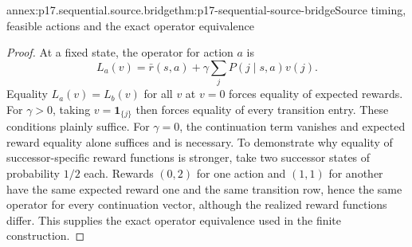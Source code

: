 \begin{annexitem}{annex:p17.sequential.source.bridge}{thm:p17-sequential-source-bridge}{Source timing, feasible actions and the exact operator equivalence}
\begin{proof}
At a fixed state, the operator for
action \(a\) is
\[
                 L_a(v)=\bar r(s,a)
                              +\gamma\sum_jP(j\mid s,a)v(j).
\]
Equality \(L_a(v)=L_b(v)\) for all \(v\)
at \(v=0\) forces equality of expected
rewards. For \(\gamma>0\), taking
\(v=\mathbf1_{\{j\}}\) then forces
equality of every transition entry.
These conditions plainly suffice.
For \(\gamma=0\), the continuation
term vanishes and expected reward
equality alone suffices and is necessary.
To demonstrate why equality of
successor-specific reward functions
is stronger, take two successor states
of probability \(1/2\) each. Rewards
\((0,2)\) for one action and \((1,1)\)
for another have the same expected
reward one and the same transition
row, hence the same operator for
every continuation vector, although
the realized reward functions differ.
This supplies the exact operator
equivalence used in the finite
construction.
\end{proof}
\end{annexitem}
